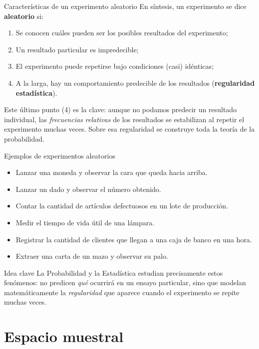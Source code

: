 \documentclass[aspectratio=169,11pt]{beamer}
\begin{document}
\begin{frame}{Características de un experimento aleatorio}
En síntesis, un experimento se dice \textbf{aleatorio} si:
\begin{enumerate}
\item Se conocen cuáles pueden ser los posibles resultados del experimento;
\item Un resultado particular es impredecible;
\item El experimento puede repetirse bajo condiciones (casi) idénticas;
\item A la larga, hay un comportamiento predecible de los resultados (\textbf{regularidad estadística}).
\end{enumerate}

\vspace{0.3em}
Este último punto (4) es la clave: aunque no podamos predecir un resultado individual, las \emph{frecuencias relativas} de los resultados se estabilizan al repetir el experimento muchas veces. Sobre esa regularidad se construye toda la teoría de la probabilidad.
\end{frame}

\begin{frame}{Ejemplos de experimentos aleatorios}
\begin{itemize}\small
\item Lanzar una moneda y observar la cara que queda hacia arriba.
\item Lanzar un dado y observar el número obtenido.
\item Contar la cantidad de artículos defectuosos en un lote de producción.
\item Medir el tiempo de vida útil de una lámpara.
\item Registrar la cantidad de clientes que llegan a una caja de banco en una hora.
\item Extraer una carta de un mazo y observar su palo.
\end{itemize}

\vspace{0.3em}
\begin{alertblock}{Idea clave}
La Probabilidad y la Estadística estudian precisamente estos fenómenos: no predicen \emph{qué} ocurrirá en un ensayo particular, sino que modelan matemáticamente la \emph{regularidad} que aparece cuando el experimento se repite muchas veces.
\end{alertblock}
\end{frame}

\section{Espacio muestral}
\end{document}
